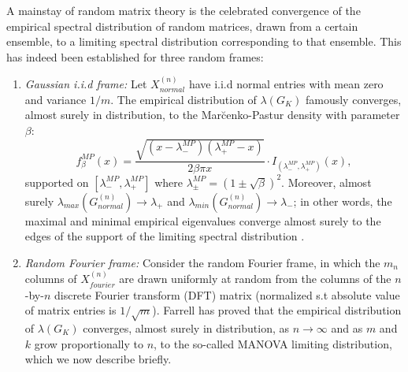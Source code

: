 \documentclass[a4paper,12pt]{article}
\newcommand{\TODO}[1]{ {\tt \color{red} [TODO:#1] } }
\newcommand{\comm}[1]{ {\tt \color{blue} [Comment:#1] } }
\newcommand{\m}{m}
\newcommand{\Gk}{\ensuremath{G_K}}
\begin{document}
A mainstay of random matrix theory is the celebrated convergence of the
empirical spectral distribution of random matrices, drawn from a certain
ensemble, to a limiting spectral distribution corresponding to that ensemble. 
This has indeed been established for three random frames:
\begin{enumerate} 

\item {\em Gaussian i.i.d frame:} Let $X_{normal}^{(n)}$ have i.i.d normal
entries with mean zero and variance $1/\m$.  The empirical
distribution of $\lambda(\Gk)$ famously converges, almost surely in
distribution, to the Mar\u cenko-Pastur density \cite{MP} with parameter
$\beta$:  
\begin{equation}
\label{MPdensity:eq}
f_{\beta}^{MP}(x)
 =\frac{\sqrt{(x-\lambda^{MP}_-)(\lambda^{MP}_+-x)}}{2\beta\pi x}\cdot
I_{(\lambda^{MP}_-,\lambda^{MP}_+)}(x),
\end{equation} 
supported on $[\lambda^{MP}_-,\lambda^{MP}_+]$ where
$\lambda^{MP}_\pm = (1\pm \sqrt{\beta})^2$.  Moreover,  almost surely
$\lambda_{max}(G_{normal}^{(n)}) \to \lambda_+$ and
$\lambda_{min}(G_{normal}^{(n)}) \to \lambda_-$; in other words, the maximal
and minimal empirical eigenvalues converge almost surely to the edges of the
support of the limiting spectral distribution \cite{silverstein_book}.

\item {\em Random Fourier frame:}
Consider the
random Fourier frame, in which the $\m_n$ columns of $X_{fourier}^{(n)}$ are drawn
uniformly
at random
from the columns of the $n$-by-$n$ discrete Fourier transform (DFT) matrix
(normalized s.t absolute value of matrix entries is $1/\sqrt{\m}$). 
Farrell \cite{Farrell} has proved that the 
empirical distribution of $\lambda(\Gk)$ converges, almost surely in
distribution,  as $n\to\infty$ and as $m$ and $k$ grow proportionally to $n$, 
to the so-called MANOVA
limiting distribution, which we now describe briefly.



\end{enumerate}
\end{document}
